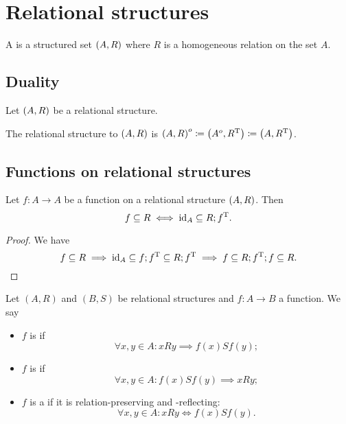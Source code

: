 \chapter{Relational structures}
\begin{definition}
A  is a structured set $\left( A, R \right)$ where $R$ is a homogeneous relation on the set $A$.
\end{definition}


\section{Duality}
\begin{definition}
Let $\left( A,R \right)$ be a relational structure.

The relational structure  to $\left( A,R \right)$ is $\left( A, R \right)^o \coloneqq \left( A^o,R^{\mathrm{T}} \right)\coloneqq \left( A,R^{\mathrm{T}} \right)$.
\end{definition}



\section{Functions on relational structures}

\begin{lemma} \label{functionSubsetRelation}
Let $f: A\to A$ be a function on a relational structure $\left( A,R \right)$. Then
\[ f \subseteq R \iff \operatorname{id}_A \subseteq R;f^{\mathrm{T}}. \]
\end{lemma}
\begin{proof}
We have
\[ f \subseteq R \implies \operatorname{id}_A \subseteq f;f^{\mathrm{T}} \subseteq R;f^{\mathrm{T}} \implies f \subseteq R;f^{\mathrm{T}};f \subseteq R. \]
\end{proof}

\begin{definition}
Let $(A, R)$ and $(B, S)$ be relational structures and $f: A\to B$ a function. We say
\begin{itemize}
\item $f$ is  if
\[ \forall x,y\in A: xRy \implies f(x)Sf(y); \]
\item $f$ is  if
\[ \forall x,y\in A: f(x)Sf(y) \implies xRy; \]
\item $f$ is a  if it is relation-preserving and -reflecting:
\[ \forall x,y\in A: xRy \iff f(x)Sf(y). \]
\end{itemize}
\end{definition}

